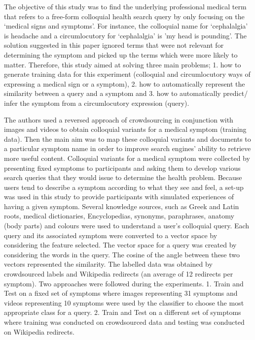 \documentclass[]{article}
\begin{document}
The objective of this study was to find the underlying professional medical term that refers to a free-form colloquial health search query by only focusing on the ‘medical signs and symptoms’. For instance, the colloquial name for ‘cephalalgia’ is headache and a circumlocutory for ‘cephalalgia’ is 'my head is pounding'. The solution suggested in this paper ignored terms that were not relevant for determining the symptom and picked up the terms which were more likely to matter. Therefore, this study aimed at solving three main problems; 1. how to generate training data for this experiment (colloquial and circumlocutory ways of expressing a medical sign or a symptom), 2. how to automatically represent the similarity between a query and a symptom and 3. how to automatically predict/ infer the symptom from a circumlocutory expression (query). 

The authors used a reversed approach of crowdsourcing in conjunction with images and videos to obtain colloquial variants for a medical symptom (training data). Then the main aim was to map these colloquial variants and documents to a particular symptom name in order to improve search engines' ability to retrieve more useful content. Colloquial variants for a medical symptom were collected by presenting fixed symptoms to participants and asking them to develop various search queries that they would issue to determine the health problem. Because users tend to describe a symptom according to what they see and feel, a set-up was used in this study to provide participants with simulated experiences of having a given symptom. Several knowledge sources, such as Greek and Latin roots, medical dictionaries, Encyclopedias, synonyms, paraphrases, anatomy (body parts) and colours were used to understand a user's colloquial query. Each query and its associated symptom were converted to a vector space by considering the feature selected. The vector space for a query was created by considering the words in the query. The cosine of the angle between these two vectors represented the similarity. The labelled data was obtained by crowdsourced labels and Wikipedia redirects (an average of 12 redirects per symptom). Two approaches were followed during the experiments. 1. Train and Test on a fixed set of symptoms where images representing 31 symptoms and videos representing 10 symptoms were used by the classifier to choose the most appropriate class for a query. 2. Train and Test on a different set of symptoms where training was conducted on crowdsourced data and testing was conducted on Wikipedia redirects.     
\end{document}
